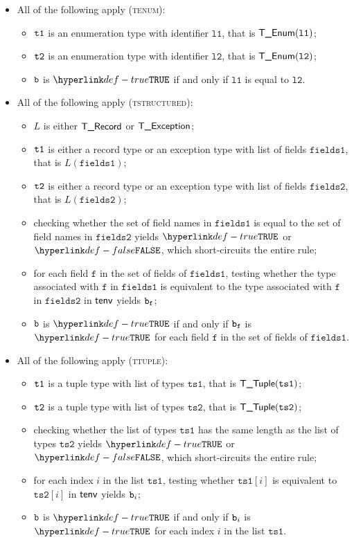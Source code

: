 \documentclass{book}
\newcommand\ProseOrTypeError[0]{\ProseTerminateAs{\TypeErrorConfig}}
\newcommand\vf[0]{\texttt{f}}
\newcommand\vtsone[0]{\texttt{ts1}}
\newcommand\vtstwo[0]{\texttt{ts2}}
\newcommand\vfieldsone[0]{\texttt{fields1}}
\newcommand\vfieldstwo[0]{\texttt{fields2}}
\newcommand\vlone[0]{\texttt{l1}}
\newcommand\vltwo[0]{\texttt{l2}}
\begin{document}
\begin{itemize}
  \item All of the following apply (\textsc{tenum}):
  \begin{itemize}
    \item $\texttt{t1}$ is an enumeration type with identifier $\vlone$, that is $\TEnum(\vlone)$;
    \item $\texttt{t2}$ is an enumeration type with identifier $\vltwo$, that is $\TEnum(\vltwo)$;
    \item $\texttt{b}$ is $\True$ if and only if $\vlone$ is equal to $\vltwo$.
  \end{itemize}

  \item All of the following apply (\textsc{tstructured}):
  \begin{itemize}
    \item $L$ is either $\textsf{T\_Record}$ or $\textsf{T\_Exception}$;
    \item $\texttt{t1}$ is either a record type or an exception type with list of fields $\vfieldsone$, that is $L(\vfieldsone)$;
    \item $\texttt{t2}$ is either a record type or an exception type with list of fields $\vfieldstwo$, that is $L(\vfieldstwo)$;
    \item checking whether the set of field names in $\vfieldsone$ is equal to the set of field names in $\vfieldstwo$
          yields $\True$ or $\False$, which short-circuits the entire rule;
    \item for each field $\vf$ in the set of fields of $\vfieldsone$, testing whether the type associated with
          $\vf$ in $\vfieldsone$ is equivalent to the type associated with
          $\vf$ in $\vfieldstwo$ in $\textsf{tenv}$ yields $\vb_\vf$\ProseOrTypeError;
    \item $\texttt{b}$ is $\True$ if and only if $\vb_\vf$ is $\True$ for each field $\vf$ in the set of fields of $\vfieldsone$.
  \end{itemize}

  \item All of the following apply (\textsc{ttuple}):
  \begin{itemize}
    \item $\texttt{t1}$ is a tuple type with list of types $\vtsone$, that is $\TTuple(\vtsone)$;
    \item $\texttt{t2}$ is a tuple type with list of types $\vtstwo$, that is $\TTuple(\vtstwo)$;
    \item checking whether the list of types $\vtsone$ has the same length as the list of types $\vtstwo$ yields $\True$
          or $\False$, which short-circuits the entire rule;
    \item for each index $i$ in the list $\vtsone$, testing whether $\vtsone[i]$ is equivalent to $\vtstwo[i]$ in $\textsf{tenv}$
          yields $\texttt{b}_i$\ProseOrTypeError;
    \item $\texttt{b}$ is $\True$ if and only if $\texttt{b}_i$ is $\True$ for each index $i$ in the list $\vtsone$.
  \end{itemize}
\end{itemize}
\end{document}
